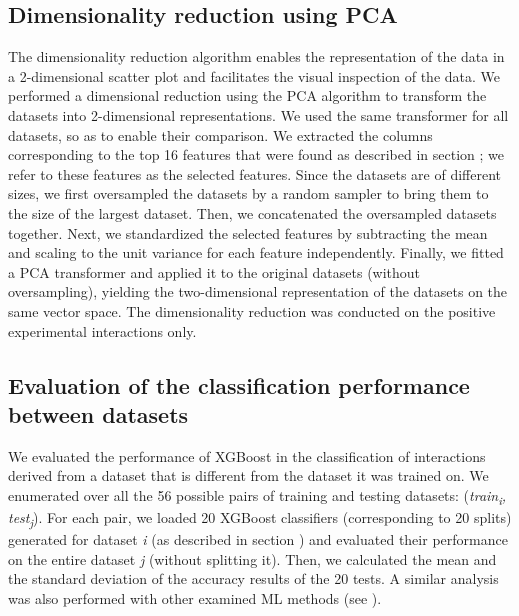 \documentclass{bmcart}
\begin{document}
\subsection*{Dimensionality reduction using PCA}
The dimensionality reduction algorithm enables the representation of the data in a 2-dimensional scatter plot and facilitates the visual inspection of the data. We performed a dimensional reduction using the PCA algorithm to transform the datasets into 2-dimensional representations. 
We used the same transformer for all datasets, so as to enable their comparison. 
We extracted the columns corresponding to the top 16 features that were found as described in section ; we refer to these features as the selected features. Since the datasets are of different sizes, we first oversampled the datasets by a random sampler to bring them to the size of the largest dataset. Then, we concatenated the oversampled datasets together. Next, we standardized the selected features by subtracting the mean and scaling to the unit variance for each feature independently. Finally, we fitted a PCA transformer and applied it to the original datasets (without oversampling), yielding the two-dimensional representation of the datasets on the same vector space. The dimensionality reduction was conducted on the positive experimental interactions only.

\subsection*{Evaluation of the classification performance between datasets}
We evaluated the performance of XGBoost in the classification of interactions derived from a dataset that is different from the dataset it was trained on. We enumerated over all the 56 possible pairs of training and testing datasets: (\textit{train\textsubscript{i}, test\textsubscript{j}}). For each pair, we loaded 20 XGBoost classifiers (corresponding to 20 splits) generated for dataset \textit{i} (as described in section ) and evaluated their performance on the entire dataset \textit{j} (without splitting it). Then, we calculated the mean and the standard deviation of the accuracy results of the 20 tests. A similar analysis was also performed with other examined ML methods (see ).




\end{document}

